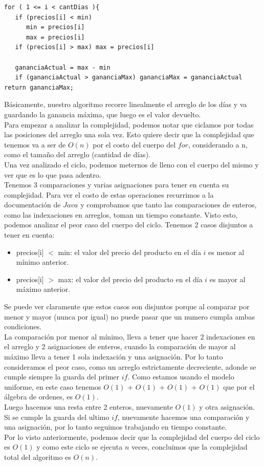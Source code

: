 \begin{verbatim}
for ( 1 <= i < cantDias ){
   if (precios[i] < min)
      min = precios[i]
      max = precios[i]
   if (precios[i] > max) max = precios[i]
   
   gananciaActual = max - min
   if (gananciaActual > gananciaMax) gananciaMax = gananciaActual
return gananciaMax;
\end{verbatim}

\indent Básicamente, nuestro algoritmo recorre linealmente el arreglo de los días y va guardando la ganancia máxima, que luego es el valor devuelto.\\
\indent Para empezar a analizar la complejidad, podemos notar que ciclamos por todas las posiciones del arreglo una sola vez. Esto quiere decir que la complejidad que tenemos va a ser de $O(n)$ por el costo del cuerpo del $for$, considerando a n, como el tamaño del arreglo (cantidad de días).\\
\indent Una vez analizado el ciclo, podemos meternos de lleno con el cuerpo del mismo y ver que es lo que pasa adentro.\\
\indent Tenemos 3 comparaciones y varias asignaciones para tener en cuenta su complejidad. Para ver el costo de estas operaciones recurrimos a la documentación de $Java$ y comprobamos que tanto las comparaciones de enteros, como las indexaciones en arreglos, toman un tiempo constante. Visto esto, podemos analizar el peor caso del cuerpo del ciclo. Tenemos 2 casos disjuntos a tener en cuenta:

\begin{itemize}
 \item precios[i] $<$ min: el valor del precio del producto en el día $i$ es menor al mínimo anterior.
 \item precios[i] $>$ max: el valor del precio del producto en el día $i$ es mayor al máximo anterior.
\end{itemize}

\indent Se puede ver claramente que estos casos son disjuntos porque al comparar por menor y mayor (nunca por igual) no puede pasar que un numero cumpla ambas condiciones.\\
\indent La comparación por menor al mínimo, lleva a tener que hacer 2 indexaciones en el arreglo y 2 asignaciones de enteros, cuando la comparación de mayor al máximo lleva a tener 1 sola indexación y una asignación. Por lo tanto consideramos el peor caso, como un arreglo estrictamente decreciente, adonde se cumple siempre la guarda del primer $if$. Como estamos usando el modelo uniforme, en este caso tenemos $O(1)$ + $O(1)$ + $O(1)$ + $O(1)$ que por el álgebra de ordenes, es $O(1)$. \\                                                   
\indent Luego hacemos una resta entre 2 enteros, nuevamente $O(1)$ y otra asignación. Si se cumple la guarda del ultimo $if$, nuevamente hacemos una comparación y una asignación, por lo tanto seguimos trabajando en tiempo constante.\\
\indent Por lo visto anteriormente, podemos decir que la complejidad del cuerpo del ciclo es $O(1)$ y como este ciclo se ejecuta $n$ veces, concluimos que la complejidad total del algoritmo es $O(n)$.\\


